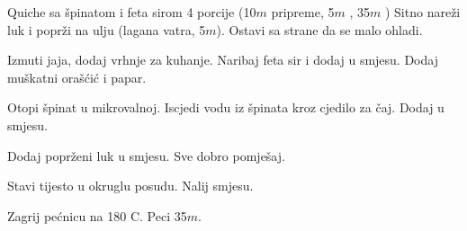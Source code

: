 \documentclass[a4paper]{article}
\begin{document}
\renewcommand*{\recipestepnumberfont}{\small\itshape}
\begin{recipe}{Quiche sa špinatom i feta sirom}%
  {4 porcije}%
  { (10$m$ pripreme, 5$m$ \fryingpan, 35$m$ \oven) \textleaf}
  Sitno nareži luk i poprži na ulju (lagana vatra, 5$m$). Ostavi sa strane da
  se malo ohladi.

  Izmuti jaja, dodaj vrhnje za kuhanje. Naribaj feta sir i dodaj u smjesu.
  Dodaj muškatni orašćić i papar.

  Otopi špinat u mikrovalnoj. Iscjedi vodu iz špinata kroz cjedilo za čaj.
  Dodaj u smjesu.

\newstep
  Dodaj poprženi luk u smjesu. Sve dobro pomješaj.

  Stavi tijesto u okruglu posudu. Nalij smjesu.

\newstep
  Zagrij pećnicu na 180\0 C. Peci 35$m$.

\end{recipe}
\end{document}
